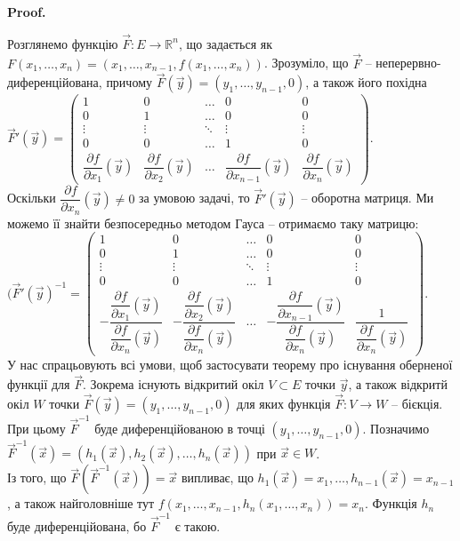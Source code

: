 \documentclass[a4paper, 10pt]{article}
\makeatletter
\def\departial#1#2{\dfrac{\partial {#1}}{\partial {#2}}}
\theoremstyle{theoremdd}
\theoremstyle{theoremdd}
\theoremstyle{theoremdd}
\theoremstyle{theoremdd}
\theoremstyle{theoremdd}
\theoremstyle{theoremdd}
\theoremstyle{theoremdd}
\theoremstyle{theoremdd}
\theoremstyle{theoremdd}
\renewenvironment{proof}[1][Proof.\\]{\par
\pushQED{\hfill \qed}%
\normalfont \topsep6\p@\@plus6\p@\relax
\trivlist
\item\relax
{\bfseries
#1\@addpunct{.}}\hspace\labelsep\ignorespaces
}{%
\popQED\endtrivlist\@endpefalse
}
\makeatother
\begin{document}
\begin{proof}
Розглянемо функцію $\vec{F} \colon E \to \mathbb{R}^n$, що задається як $F(x_1,\dots,x_n) = (x_1,\dots,x_{n-1}, f(x_1,\dots,x_n))$. Зрозуміло, що $\vec{F}$ -- неперервно-диференційована, причому $\vec{F}(\vec{y}) = (y_1,\dots,y_{n-1},0)$, а також його похідна\\
$\vec{F}'(\vec{y}) = \begin{pmatrix}
1 & 0 & \dots & 0 & 0 \\
0 & 1 & \dots & 0 & 0 \\
\vdots & \vdots & \ddots & \vdots & \vdots \\
0 & 0 & \dots & 1 & 0 \\
\departial{f}{x_1}(\vec{y}) & \departial{f}{x_2}(\vec{y}) & \dots & \departial{f}{x_{n-1}}(\vec{y}) & \departial{f}{x_n}(\vec{y})
\end{pmatrix}$.\\
Оскільки $\departial{f}{x_n}(\vec{y}) \neq 0$ за умовою задачі, то $\vec{F}'(\vec{y})$ -- оборотна матриця. Ми можемо її знайти безпосередньо методом Гауса -- отримаємо таку матрицю:\\
$(\vec{F}'(\vec{y})^{-1} = \begin{pmatrix}
1 & 0 & \dots & 0 & 0 \\
0 & 1 & \dots & 0 & 0 \\
\vdots & \vdots & \ddots & \vdots & \vdots \\
0 & 0 & \dots & 1 & 0 \\
-\dfrac{\departial{f}{x_1}(\vec{y})}{\departial{f}{x_n}(\vec{y})} & -\dfrac{\departial{f}{x_2}(\vec{y})}{\departial{f}{x_n}(\vec{y})} & \dots & -\dfrac{\departial{f}{x_{n-1}}(\vec{y})}{\departial{f}{x_n}(\vec{y})} & \dfrac{1}{\departial{f}{x_n}(\vec{y})}
\end{pmatrix}$.\\
У нас спрацьовують всі умови, щоб застосувати теорему про існування оберненої функції для $\vec{F}$. Зокрема існують відкритий окіл $V \subset E$ точки $\vec{y}$, а також відкритй окіл $W$ точки $\vec{F}(\vec{y}) = (y_1,\dots,y_{n-1},0)$ для яких функція $\vec{F} \colon V \to W$ -- бієкція. При цьому $\vec{F}^{-1}$ буде диференційованою в точці $(y_1,\dots,y_{n-1},0)$. Позначимо $\vec{F}^{-1}(\vec{x}) = (h_1(\vec{x}),h_2(\vec{x}),\dots,h_n(\vec{x}))$ при $\vec{x} \in W$.\\
Із того, що $\vec{F}(\vec{F}^{-1}(\vec{x})) = \vec{x}$ випливає, що $h_1(\vec{x}) = x_1,\dots, h_{n-1}(\vec{x}) = x_{n-1}$, а також найголовніше тут $f(x_1,\dots,x_{n-1}, h_n(x_1,\dots,x_n)) = x_n$. Функція $h_n$ буде диференційована, бо $\vec{F}^{-1}$ є такою.\\

\end{proof}
\end{document}
